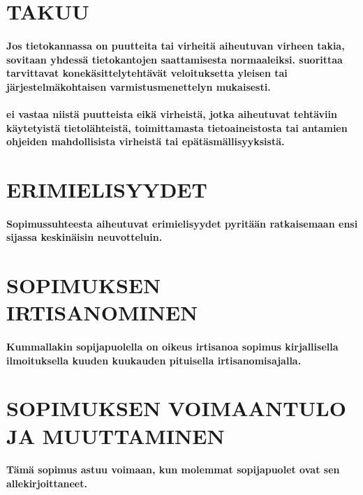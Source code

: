 \documentclass[a4paper,finnish]{article}
\begin{document}
\section{TAKUU}

\paragraph{Jos tietokannassa on puutteita tai virheitä
 aiheutuvan virheen takia, sovitaan yhdessä
tietokantojen saattamisesta normaaleiksi.  suorittaa
tarvittavat konekäsittelytehtävät veloituksetta 
yleisen tai järjestelmäkohtaisen varmistusmenettelyn mukaisesti.}

\paragraph{ ei vastaa niistä puutteista eikä virheistä, jotka
aiheutuvat tehtäviin käytetyistä tietolähteistä, 
toimittamasta tietoaineistosta tai  antamien ohjeiden
mahdollisista virheistä tai epätäsmällisyyksistä.}

\section{ERIMIELISYYDET}
 
\paragraph{Sopimussuhteesta aiheutuvat erimielisyydet pyritään
ratkaisemaan ensi sijassa keskinäisin neuvotteluin.}

\section{SOPIMUKSEN IRTISANOMINEN}
 
\paragraph{Kummallakin sopijapuolella on oikeus irtisanoa sopimus
kirjallisella ilmoituksella kuuden kuukauden pituisella
irtisanomisajalla.}
 
\section{SOPIMUKSEN VOIMAANTULO JA MUUTTAMINEN}
 
\paragraph{Tämä sopimus astuu voimaan, kun molemmat sopijapuolet ovat
sen allekirjoittaneet.}
\end{document}
